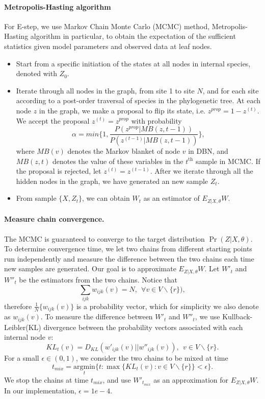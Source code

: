 \documentclass[11pt]{article}
\theoremstyle{theorem}
\theoremstyle{proposition}
\begin{document}
\paragraph{Metropolis-Hasting algorithm}
For E-step, we use Markov Chain Monte Carlo (MCMC) method,
Metropolis-Hasting algorithm in particular, to obtain the expectation
of the sufficient statistics given model parameters and observed data
at leaf nodes.

\begin{itemize}
\item Start from a specific initiation of the states at all nodes in
internal species, denoted with $Z_0$.
\item Iterate through all nodes in the graph, from site 1 to site $N$,
and for each site according to a post-order traversal of species in
the phylogenetic tree. At each node $z$ in the graph, we make a
proposal to flip its state, i.e. $z^{prop}=1-z^{(t)}$.  We accept the
proposal $z^{(t)} = z^{prop}$ with probability
\[
\alpha=min\{1, \frac{P(z^{prop}| MB(z,t-1))}{P(z^{(t-1)}|MB(z,t-1))}\},
\]
where $MB(v)$ denotes the Markov blanket of node $v$ in DBN, and $MB(z,t)$ denotes the value of these variables in the $t^{\text{th}}$ sample in MCMC.
If the proposal is rejected, let $z^{(t)}= z^{(t-1)}$. After we
iterate through all the hidden nodes in the graph, we have generated
an new sample $Z_{t}$.
\item From sample $\{X, Z_{t}\}$, we can obtain $W_{t}$ as an
estimator of $E_{Z|X,\theta}W$.
\end{itemize}

\paragraph{Measure chain convergence.}
The MCMC is guaranteed to converge to the target distribution $\Pr(Z|
X, \theta)$. To determine convergence time, we let two chains from
different starting points run independently and measure the difference
between the two chains each time new samples are generated. Our goal
is to approximate $E_{Z|X,\theta}W$. Let $W'_{t}$ and $W''_{t}$ be the
estimators from the two chains. Notice that
\[
\sum_{ijk} w_{ijk}(v) = N,~~\forall v\in\textit{V}\backslash\{r\}),
\]
therefore $\frac{1}{N}\{w_{ijk}(v)\}$ is a probability vector, which
for simplicity we also denote as $w_{ijk}(v)$. To measure the
difference between $W'_{t}$ and $W''_{t}$, we use Kullback-Leibler(KL)
divergence between the probability vectors associated with each
internal node $v$:
\[
KL_t(v) = D_{KL}(w'_{ijk}(v) || w''_{ijk}(v)), ~~ v\in\textit{V}\backslash\{r\}.
\]
For a small $\epsilon\in(0,1)$, we consider the two chains to be mixed
at time
\[
t_{mix}= \underset{t}{\mathrm{argmin}} \{t: \max\{KL_t(v): v\in\textit{V}\backslash\{r\}\} < \epsilon\}.
\]
We stop the chains at time $t_{mix}$, and use $W'_{t_{mix}}$ as an
approximation for $E_{Z|X,\theta}W$. In our implementation, $\epsilon=1e-4$.
\end{document}
